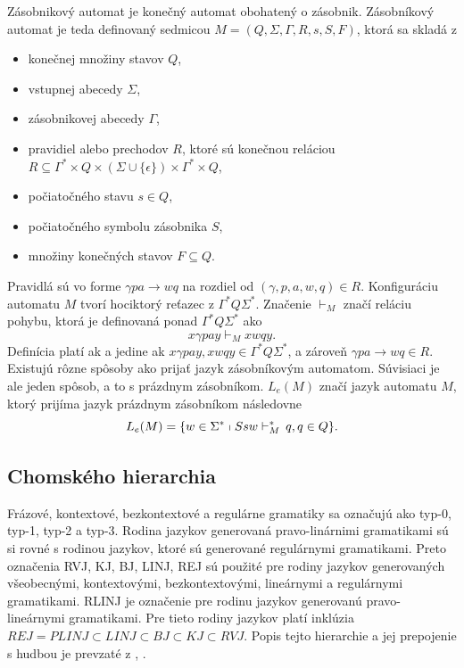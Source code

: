 \begin{definition}
Zásobnikový automat je konečný automat obohatený o zásobnik. Zásobníkový automat je teda definovaný sedmicou $M = (Q,\Sigma, \Gamma , R,s,S,F)$, ktorá sa skladá z
\begin{itemize}\itemsep0.05em
    \item konečnej množiny stavov $Q$,
    \item vstupnej abecedy $\Sigma$,
    \item zásobnikovej abecedy $\Gamma$,
    \item pravidiel alebo prechodov $R$, ktoré sú konečnou reláciou $R \subseteq \Gamma^* \times Q \times (\Sigma \cup \{\epsilon\}) \times \Gamma^* \times Q$,
    \item počiatočného stavu $s \in Q$,
    \item počiatočného symbolu zásobnika $S$,
    \item množiny konečných stavov $F \subseteq Q$.
\end{itemize}
Pravidlá sú vo forme $\gamma pa \rightarrow wq$ na rozdiel od $(\gamma , p, a, w, q) \in R$. Konfiguráciu automatu $M$ tvorí hociktorý reťazec z $\Gamma^* Q\Sigma^*$. Značenie $\vdash_M$ značí reláciu pohybu, ktorá je definovaná ponad $\Gamma^* Q\Sigma^*$ ako $$x\gamma pay \vdash_M xwqy.$$ Definícia platí ak a jedine ak $x\gamma pay, xwqy \in \Gamma^* Q\Sigma^*$, a zároveň $\gamma pa \rightarrow wq \in R$. Existujú rôzne spôsoby ako prijať jazyk zásobníkovým automatom. Súvisiaci je ale jeden spôsob, a to s prázdnym zásobníkom. $L_e(M)$ značí jazyk automatu $M$, ktorý prijíma jazyk prázdnym zásobníkom následovne $$L_e(M) = \{w \in \Sigma^* \shortmid Ssw \vdash_M^* \,q,q \in Q\}.$$
\end{definition}

\subsection{Chomského hierarchia}
Frázové, kontextové, bezkontextové a regulárne gramatiky sa označujú ako typ-0, typ-1, typ-2 a typ-3. Rodina jazykov generovaná pravo-linárnimi gramatikami sú si rovné s rodinou jazykov, ktoré sú generované regulárnymi gramatikami. Preto označenia RVJ, KJ, BJ, LINJ, REJ sú použité pre rodiny jazykov generovaných všeobecnými, kontextovými, bezkontextovými, lineárnymi a regulárnymi gramatikami. RLINJ je označenie pre rodinu jazykov generovanú pravo-lineárnymi gramatikami. Pre tieto rodiny jazykov platí inklúzia $REJ = PLINJ \subset LINJ \subset BJ \subset KJ \subset RVJ$. Popis tejto hierarchie a jej prepojenie s hudbou je prevzaté z \cite{jstorgrammusic}, \cite{musicformallang}.

